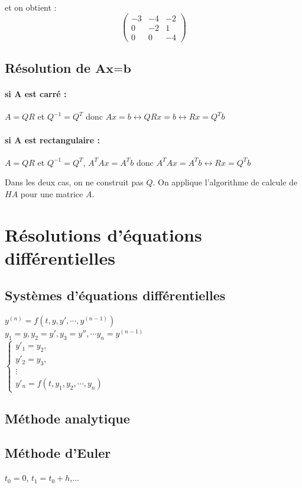 \documentclass[a4paper,9pt]{extarticle}
\begin{document}
\begin{multicols*}{2}
et on obtient :
$$
\begin{pmatrix}
-3 & -4 & -2 \\
0 & -2 & 1 \\
0 & 0 & -4
\end{pmatrix}
$$

\subsection{Résolution de $\textbf{Ax=b}$}

\paragraph*{si \textbf{A} est carré : } $A=QR$ et $Q^{-1}=Q^T$ donc $Ax=b \leftrightarrow QRx = b \leftrightarrow Rx = Q^Tb$
\paragraph*{si \textbf{A} est rectangulaire : } $A=QR$ et $Q^{-1}=Q^T$, $A^TAx=A^Tb$ donc $A^TAx=A^Tb\leftrightarrow Rx = Q^Tb$

Dans les deux cas, on ne construit pas $Q$. On applique l'algorithme de calcule de $HA$ pour une matrice $A$.

\section{Résolutions d'équations différentielles}

\subsection{Systèmes d'équations différentielles}
$y^{(n)} = f(t,y,y',\cdots,y^{(n-1)})$\\
$y_1=y,y_2=y',y_3=y'', \cdots y_n = y^{(n-1)}$\\
$
\begin{cases}
	y'_1 = y_2,\\
	y'_2 = y_3, \\
	\vdots\\
	y'_n=f(t,y_1,y_2,\cdots,y_n)
\end{cases}
$
\subsection{Méthode analytique}
\subsection{Méthode d'Euler}
$t_0=0$, $t_1=t_0+h$,...


\end{multicols*}
\end{document}
